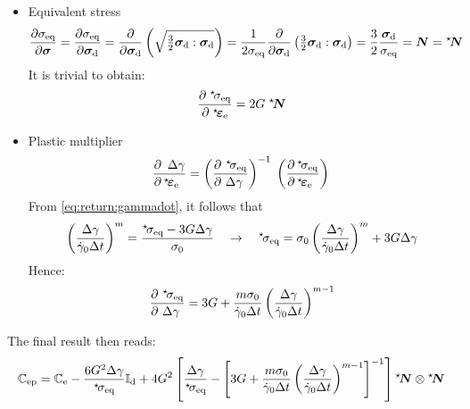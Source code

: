 \documentclass[times,namecite]{goose-article}
\newcommand\leftstar[1]{\hspace*{-.3em}~^\star\!#1}
\begin{document}
\begin{itemize}
%
\item Equivalent stress
%
\begin{equation}
\frac{\partial \sigma_\mathrm{eq}}{\partial \bm{\sigma}}
  = \frac{
    \partial \sigma_\mathrm{eq}
  }{
    \partial \bm{\sigma}_\mathrm{d}
  }
  = \frac{
    \partial
  }{
    \partial \bm{\sigma}_\mathrm{d}
  } \left(
    \sqrt{ \tfrac{3}{2} \bm{\sigma}_\mathrm{d} : \bm{\sigma}_\mathrm{d} }
  \right)
  = \frac{1}{2 \sigma_\mathrm{eq} }
  \frac{\partial}{\partial \bm{\sigma}_\mathrm{d}}
  \left(
    \tfrac{3}{2} \bm{\sigma}_\mathrm{d} : \bm{\sigma}_\mathrm{d}
  \right)
  = \frac{3}{2} \frac{\bm{\sigma}_\mathrm{d}}{\sigma_\mathrm{eq}}
  = \bm{N} = \leftstar{\bm{N}}
\end{equation}
%
It is trivial to obtain:
%
\begin{equation}
\frac{
    \partial \;\leftstar{\sigma}_\mathrm{eq}
  }{
    \partial \;\leftstar{\bm{\varepsilon}}_\mathrm{e}
  } =
  2 G \;\leftstar{\bm{N}}
\end{equation}
%
\item Plastic multiplier
%
\begin{align}
  \frac{
    \partial \,~\Delta \gamma \hfill
  }{
    \partial \,\leftstar{\bm{\varepsilon}}_\mathrm{e}  \hfill
  }
  =
  \left( \frac{
    \partial ~\leftstar{\sigma}_\mathrm{eq} \hfill
  }{
    \partial ~\Delta \gamma      \hfill
  } \right)^{-1} \;
  \left( \frac{
    \partial \,\leftstar{\sigma}_\mathrm{eq} \hfill
  }{
    \partial \,\leftstar{\bm{\varepsilon}}_\mathrm{e} \hfill
  } \right) \;
\end{align}
%
From \eqref{eq:return:gammadot}, it follows that
%
\begin{equation}
\left(
    \frac{\Delta \gamma}{\dot{\gamma}_0 \Delta t}
  \right)^m
  =
  \frac{
    \leftstar{\sigma}_\mathrm{eq} - 3 G \Delta \gamma
  }{
    \sigma_0
  }
  \quad\rightarrow\quad
  \leftstar{\sigma}_\mathrm{eq}
  =
  \sigma_0 \left( \frac{\Delta \gamma}{\dot{\gamma}_0 \Delta t} \right)^m +
  3 G \Delta \gamma
\end{equation}
%
Hence:
%
\begin{equation}
\frac{
    \partial ~\leftstar{\sigma}_\mathrm{eq} \hfill
  }{
    \partial ~\Delta \gamma      \hfill
  }
  =
  3 G + \frac{m \sigma_0}{\dot{\gamma}_0 \Delta t}
  \left(
    \frac{\Delta \gamma}{\dot{\gamma}_0 \Delta t}
  \right)^{m-1}
\end{equation}
%
\end{itemize}
%
The final result then reads:
%
\begin{equation}
\mathbb{C}_\mathrm{ep}
=
\mathbb{C}_\mathrm{e} -
\frac{6 G^2 \Delta \gamma}{\leftstar{\sigma}_\mathrm{eq}} \mathbb{I}_\mathrm{d}
+ 4 G^2
\left[
  \frac{\Delta \gamma}{\leftstar{\sigma}_\mathrm{eq}} -
  \left[
    3G + \frac{m \sigma_0}{\dot{\gamma}_0 \Delta t}
    \left(
      \frac{\Delta \gamma}{\dot{\gamma}_0 \Delta t}
    \right)^{m-1}
  \right]^{-1}
\right]
\leftstar{\bm{N}} \otimes \leftstar{\bm{N}}
\end{equation}
%
\end{document}
